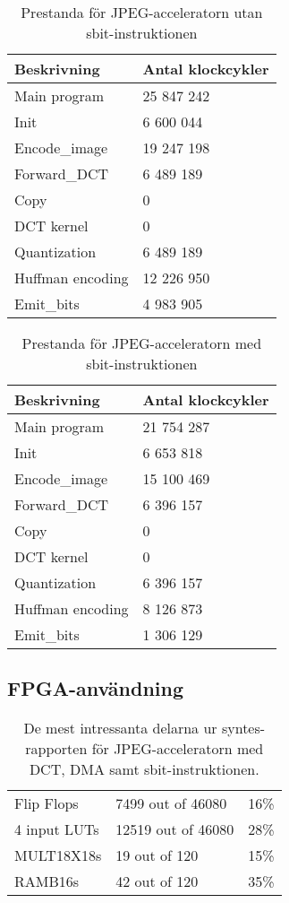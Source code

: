 \documentclass[a4paper]{article}
\begin{document}
\begin{table}[ht]
    \centering
    \begin{tabular}{l l}
        Beskrivning & Antal klockcykler\\
        \hline
        Main program  & 25 847 242 \\
        Init  &  6 600 044 \\
        Encode\_image  & 19 247 198 \\
        Forward\_DCT  & 6 489 189 \\
        Copy  & 0 \\
        DCT kernel  & 0 \\
        Quantization  & 6 489 189 \\
        Huffman encoding  & 12 226 950 \\
        Emit\_bits  &  4 983 905 \\
    \end{tabular}
    \caption{ Prestanda för JPEG-acceleratorn utan sbit-instruktionen }
    \label{tab:jpeg_sw_performance}
\end{table}

\begin{table}[ht]
    \centering
    \begin{tabular}{l l}
        Beskrivning & Antal klockcykler\\
        \hline
        Main program  & 21 754 287 \\
        Init  & 6 653 818 \\
        Encode\_image  & 15 100 469 \\
        Forward\_DCT  & 6 396 157 \\
        Copy  & 0 \\
        DCT kernel  & 0 \\
        Quantization  & 6 396 157 \\
        Huffman encoding  & 8 126 873 \\
        Emit\_bits  & 1 306 129 \\
    \end{tabular}
    \caption{ Prestanda för JPEG-acceleratorn med sbit-instruktionen }
    \label{tab:jpeg_sbit_performance}
\end{table}

\subsection{FPGA-användning}
\begin{table}[ht]
    \centering
    \begin{tabular}{l l l}
        Flip Flops   &      7499 out of   46080  & 16\% \\
        4 input LUTs &      12519 out of  46080  & 28\% \\
        MULT18X18s   &      19 out of 120  &   15\% \\
        RAMB16s      &      42 out of 120  &   35\% \\
    \end{tabular}
    \caption{ De mest intressanta delarna ur syntes-rapporten för JPEG-acceleratorn med DCT, DMA samt sbit-instruktionen. }
    \label{tab:fpga_usage}
\end{table}
\end{document}
